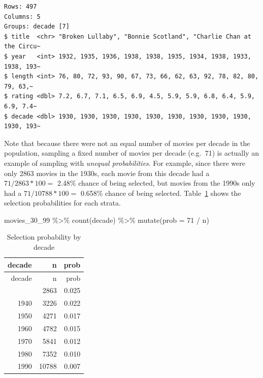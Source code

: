 \documentclass[
  letterpaper,
  DIV=11,
  numbers=noendperiod]{scrreprt}
\newenvironment{Shaded}{\begin{snugshade}}{\end{snugshade}}
\newcommand{\AttributeTok}[1]{\textcolor[rgb]{0.40,0.45,0.13}{#1}}
\newcommand{\DecValTok}[1]{\textcolor[rgb]{0.68,0.00,0.00}{#1}}
\newcommand{\FunctionTok}[1]{\textcolor[rgb]{0.28,0.35,0.67}{#1}}
\newcommand{\NormalTok}[1]{\textcolor[rgb]{0.00,0.23,0.31}{#1}}
\newcommand{\SpecialCharTok}[1]{\textcolor[rgb]{0.37,0.37,0.37}{#1}}
\theoremstyle{definition}
\theoremstyle{remark}
\begin{document}
\begin{verbatim}
Rows: 497
Columns: 5
Groups: decade [7]
$ title  <chr> "Broken Lullaby", "Bonnie Scotland", "Charlie Chan at the Circu~
$ year   <int> 1932, 1935, 1936, 1938, 1938, 1935, 1934, 1938, 1933, 1938, 193~
$ length <int> 76, 80, 72, 93, 90, 67, 73, 66, 62, 63, 92, 78, 82, 80, 79, 63,~
$ rating <dbl> 7.2, 6.7, 7.1, 6.5, 6.9, 4.5, 5.9, 5.9, 6.8, 6.4, 5.9, 6.9, 7.4~
$ decade <dbl> 1930, 1930, 1930, 1930, 1930, 1930, 1930, 1930, 1930, 1930, 193~
\end{verbatim}

Note that because there were not an equal number of movies per decade in
the population, sampling a fixed number of movies per decade (e.g.~71)
is actually an example of sampling with \emph{unequal probabilities}.
For example, since there were only 2863 movies in the 1930s, each movie
from this decade had a \(71 / 2863 * 100 =\) 2.48\% chance of being
selected, but movies from the 1990s only had a \(71 / 10788 * 100 =\)
0.658\% chance of being selected. Table~\ref{tbl-strata-probs} shows the
selection probabilities for each strata.

\begin{Shaded}
\begin{Highlighting}[]
\NormalTok{movies\_30\_99 }\SpecialCharTok{\%\textgreater{}\%} 
  \FunctionTok{count}\NormalTok{(decade) }\SpecialCharTok{\%\textgreater{}\%} 
  \FunctionTok{mutate}\NormalTok{(}\AttributeTok{prob =} \DecValTok{71} \SpecialCharTok{/}\NormalTok{ n)}
\end{Highlighting}
\end{Shaded}

\hypertarget{tbl-strata-probs}{}
\begin{longtable}[]{@{}rrr@{}}
\caption{\label{tbl-strata-probs}Selection probability by
decade}\tabularnewline
\toprule\noalign{}
decade & n & prob \\
\midrule\noalign{}
\endfirsthead
\toprule\noalign{}
decade & n & prob \\
\midrule\noalign{}
\endhead
\bottomrule\noalign{}
\endlastfoot
1930 & 2863 & 0.025 \\
1940 & 3226 & 0.022 \\
1950 & 4271 & 0.017 \\
1960 & 4782 & 0.015 \\
1970 & 5841 & 0.012 \\
1980 & 7352 & 0.010 \\
1990 & 10788 & 0.007 \\
\end{longtable}
\end{document}
